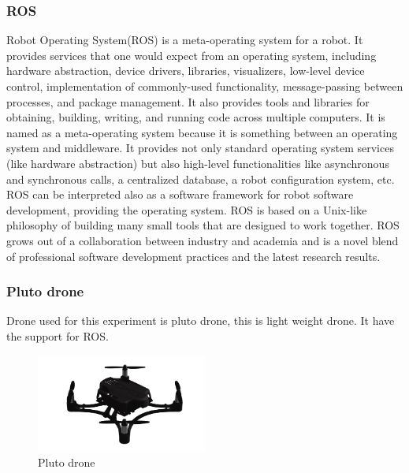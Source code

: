 \subsubsection{ROS}
Robot Operating System(ROS) is a meta-operating system for a robot. It provides services that one would expect from an operating system, including hardware abstraction, device drivers, libraries, visualizers, low-level device control, implementation of commonly-used functionality, message-passing between processes, and package management. It also provides tools and libraries for obtaining, building, writing, and running code across multiple computers. It is named as a meta-operating system because it is something between an operating system and middleware. It provides not only standard operating system services (like hardware abstraction) but also high-level functionalities like asynchronous and synchronous calls, a centralized database, a robot configuration system, etc. ROS can be interpreted also as a software framework for robot software development, providing the operating system. ROS is based on a Unix-like philosophy of building many small tools that are designed to work together. ROS grows out of a collaboration between industry and academia and is a novel blend of professional software development practices and the latest research results.\cite{ros}

\subsubsection{Pluto drone}
Drone used for this experiment is pluto drone, this is light weight drone. It have the support for ROS.\cite{plutoros}
\begin{figure}[H]
    \centering
    \includegraphics[width=0.5\textwidth]{images/pluto.png}
    \caption{Pluto drone}
\end{figure}


